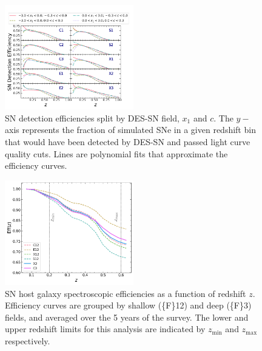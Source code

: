 \documentclass[fleqn,usenatbib]{mnras}
\begin{document}
\begin{figure}
    \centering
    \includegraphics[width=0.5\textwidth]{figs/SN_efficiencies_z_x1_c.png}
    \caption{ SN detection efficiencies split by DES-SN field, $x_1$ and $c$. The $y-$axis represents the fraction of simulated SNe in a given redshift bin that would have been detected by DES-SN and passed light curve quality cuts. Lines are polynomial fits that approximate the efficiency curves. 
    \label{fig:SN_efficiency}}
\end{figure}


\begin{figure}
    \centering
    \includegraphics[width=0.5\textwidth]{figs/eff_z.png}
    \caption{SN host galaxy spectroscopic efficiencies as a function of redshift $z$. Efficiency curves are grouped by shallow (\{F\}12) and deep (\{F\}3) fields, and averaged over the 5 years of the survey. The lower and upper redshift limits for this analysis are indicated by $z_{\mathrm{min}}$ and $z_{\mathrm{max}}$ respectively.
    \label{fig:eff_z}}
\end{figure}
\end{document}
